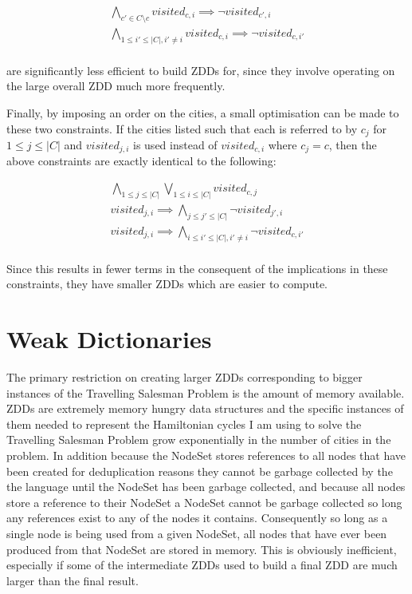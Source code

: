 \documentclass[12pt,a4paper,twoside,openright]{report}
\begin{document}
\begin{gather*}
\bigwedge_{c'\in C\setminus c}visited_{c,i}\implies\neg visited_{c',i} \\
\bigwedge_{1\leq i'\leq |C|,i'\neq i}visited_{c,i}\implies\neg visited_{c,i'} \\
\end{gather*}

are significantly less efficient to build ZDDs for, since they involve operating on the large overall ZDD much more frequently.

Finally, by imposing an order on the cities, a small optimisation can be made to these two constraints. If the cities listed such that each is referred to by $c_j$ for $1\leq j\leq |C|$ and $visited_{j,i}$ is used instead of $visited_{c,i}$ where $c_j=c$, then the above constraints are exactly identical to the following:

\begin{gather*}
\bigwedge_{1\leq j\leq |C|}\bigvee_{1\leq i\leq |C|} visited_{c,j} \\
visited_{j,i}\implies\bigwedge_{j\leq j'\leq |C|}\neg visited_{j',i} \\
visited_{j,i}\implies\bigwedge_{i\leq i'\leq |C|,i'\neq i}\neg visited_{c,i'} \\
\end{gather*}

Since this results in fewer terms in the consequent of the implications in these constraints, they have smaller ZDDs which are easier to compute.

\section{Weak Dictionaries}
The primary restriction on creating larger ZDDs corresponding to bigger instances of the Travelling Salesman Problem is the amount of memory available. ZDDs are extremely memory hungry data structures and the specific instances of them needed to represent the Hamiltonian cycles I am using to solve the Travelling Salesman Problem grow exponentially in the number of cities in the problem. In addition because the NodeSet stores references to all nodes that have been created for deduplication reasons they cannot be garbage collected by the the language until the NodeSet has been garbage collected, and because all nodes store a reference to their NodeSet a NodeSet cannot be garbage collected so long any references exist to any of the nodes it contains. Consequently so long as a single node is being used from a given NodeSet, all nodes that have ever been produced from that NodeSet are stored in memory. This is obviously inefficient, especially if some of the intermediate ZDDs used to build a final ZDD are much larger than the final result.
\end{document}

